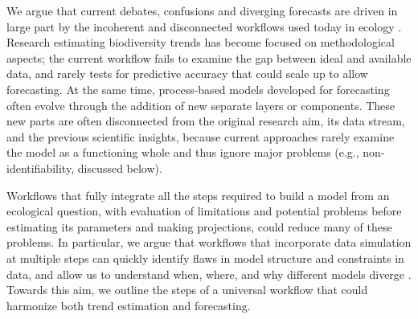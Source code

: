 \documentclass[11pt]{article}
\begin{document}
We argue that current debates, confusions and diverging forecasts are driven in large part by the incoherent and disconnected workflows used today in ecology \citep{Loreau2022, Talis2023, Johnson2024}. Research estimating biodiversity trends has become focused on methodological aspects; the current workflow fails to examine the gap between ideal and available data, and rarely tests for predictive accuracy that could scale up to allow forecasting. At the same time, process-based models developed for forecasting often evolve through the addition of new separate layers or components. These new parts are often disconnected from the original research aim, its data stream, and the previous scientific insights, because current approaches rarely examine the model as a functioning whole and thus ignore major problems (e.g., non-identifiability, discussed below).

Workflows that fully integrate all the steps required to build a model from an ecological question, with evaluation of limitations and potential problems before estimating its parameters and making projections, could reduce many of these problems. In particular, we argue that workflows that incorporate data simulation at multiple steps can quickly identify flaws in model structure and constraints in data, and allow us to understand when, where, and why different models diverge \citep{McElreath2018, betanworkflow,Gelman2020,Schad2020,grinsztajn2021,vandeschoot2021,Wolkovich2024}. Towards this aim, we outline the steps of a universal workflow that could harmonize both trend estimation and forecasting.
\end{document}
